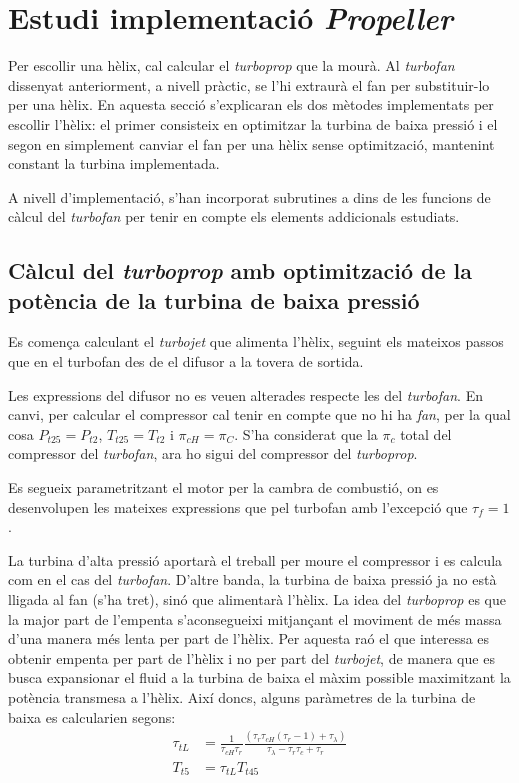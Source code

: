 \section{Estudi implementació \textit{Propeller}}
Per escollir una hèlix, cal calcular el \textit{ turboprop} que la mourà. Al \textit{turbofan} dissenyat anteriorment, a nivell pràctic, se l'hi extraurà el fan per substituir-lo per una hèlix. En aquesta secció s'explicaran els dos mètodes implementats per escollir l'hèlix: el primer consisteix en optimitzar la turbina de baixa pressió i el segon en simplement canviar el fan per una hèlix sense optimització, mantenint constant la turbina implementada.

\noindent A nivell d'implementació, s'han incorporat subrutines a dins de les funcions de càlcul del \textit{turbofan} per tenir en compte els elements addicionals estudiats.
\subsection{Càlcul del \textit{turboprop} amb optimització de la potència de la turbina de baixa pressió}
Es comença calculant el \textit{turbojet} que alimenta l'hèlix, seguint els mateixos passos que en el turbofan des de el difusor a la tovera de sortida.

\noindent Les expressions del difusor no es veuen alterades respecte les del \textit{turbofan}. En canvi, per calcular el compressor cal tenir en compte que no hi ha \textit{fan}, per la qual cosa $P_{t25}=P_{t2}$, $T_{t25}=T_{t2}$ i $\pi_{cH}=\pi_{C}$. S'ha considerat que la $\pi_c$ total del compressor del \textit{turbofan}, ara ho sigui del compressor del \textit{turboprop}.

\noindent Es segueix parametritzant el motor per la cambra de combustió, on es desenvolupen les mateixes expressions que pel turbofan amb l'excepció que $\tau_f=1$.

\noindent La turbina d'alta pressió aportarà el treball per moure el compressor i es calcula com en el cas del \textit{turbofan}. D'altre banda, la turbina de baixa pressió ja no està lligada al fan (s'ha tret), sinó que alimentarà l'hèlix. La idea del \textit{turboprop} es que la major part de l'empenta s'aconsegueixi mitjançant el moviment de més massa d'una manera més lenta per part de l'hèlix. Per aquesta raó el que interessa es obtenir empenta per part de l'hèlix i no per part del \textit{turbojet}, de manera que es busca expansionar el fluid a la turbina de baixa el màxim possible maximitzant la potència transmesa a l'hèlix. 
\noindent Així doncs, alguns paràmetres de la turbina de baixa es calcularien segons:
\begin{align}
	\tau_{tL}&=\frac{1}{\tau_{cH}\tau_r}\frac{(\tau_r\tau_{cH}(\tau_r-1)+\tau_\lambda)}{\tau_\lambda-\tau_r\tau_{c}+\tau_r}\label{turboprop_turbopt}\\
	T_{t5}&=\tau_{tL}T_{t45}
\end{align}

